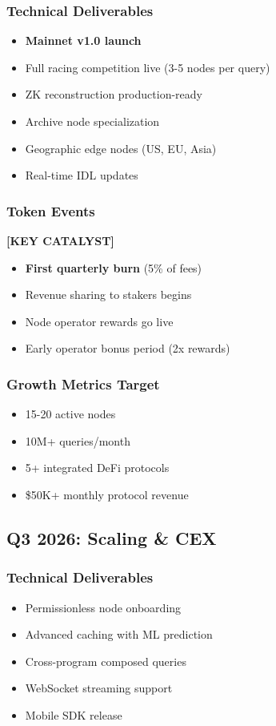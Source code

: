 \documentclass[12pt,a4paper]{article}
\begin{document}
\subsubsection{Technical Deliverables}
\begin{itemize}
    \item \textbf{Mainnet v1.0 launch}
    \item Full racing competition live (3-5 nodes per query)
    \item ZK reconstruction production-ready
    \item Archive node specialization
    \item Geographic edge nodes (US, EU, Asia)
    \item Real-time IDL updates
\end{itemize}

\subsubsection{Token Events} \textbf{[KEY CATALYST]}
\begin{itemize}
    \item \textbf{First quarterly burn} (5\% of fees)
    \item Revenue sharing to stakers begins
    \item Node operator rewards go live
    \item Early operator bonus period (2x rewards)
\end{itemize}

\subsubsection{Growth Metrics Target}
\begin{itemize}
    \item 15-20 active nodes
    \item 10M+ queries/month
    \item 5+ integrated DeFi protocols
    \item \$50K+ monthly protocol revenue
\end{itemize}

\subsection{Q3 2026: Scaling \& CEX}

\subsubsection{Technical Deliverables}
\begin{itemize}
    \item Permissionless node onboarding
    \item Advanced caching with ML prediction
    \item Cross-program composed queries
    \item WebSocket streaming support
    \item Mobile SDK release
\end{itemize}
\end{document}
